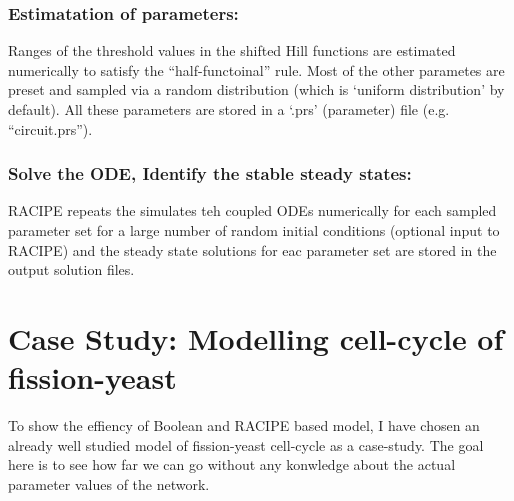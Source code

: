 \documentclass{article}
\begin{document}
\subsubsection*{Estimatation of parameters:}
Ranges of the threshold values in the shifted Hill functions are estimated 
numerically to satisfy the ``half-functoinal'' rule. Most of the other 
parametes are preset and sampled via a random distribution (which is `uniform 
distribution' by default). All these parameters are stored in a `.prs' (parameter)
file (e.g. ``circuit.prs'').

\subsubsection*{Solve the ODE, Identify the stable steady states:} RACIPE 
repeats the simulates teh coupled ODEs numerically for each sampled parameter
set for a large number of random initial conditions (optional input to RACIPE) 
and the steady state solutions for eac parameter set are stored in the output 
solution files.  
\newpage
\section*{Case Study: Modelling cell-cycle of fission-yeast}
To show the effiency of Boolean and RACIPE based model, I have chosen an 
already well studied model of fission-yeast cell-cycle as a case-study. The 
goal here is to see how far we can go without any konwledge about the actual
parameter values of the network.
\end{document}
